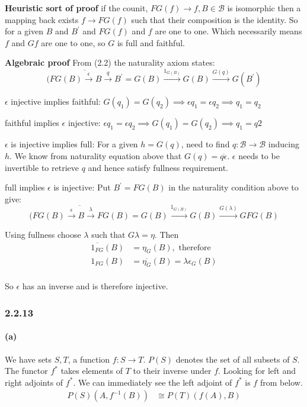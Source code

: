 \documentclass{article}
\begin{document}
\textbf{Heuristic sort of proof}
if the counit, $FG (f) \rightarrow f, B \in \mathcal{B}$ is isomorphic then a mapping back exists $f \rightarrow FG (f)$ such that their composition is the identity. So for a given $B$ and $B^\prime$ and $FG(f)$ and $f$ are one to one. Which necessarily means $f$ and $Gf$ are one to one, so $G$ is full and faithful.

\textbf{Algebraic proof}
From (2.2) the naturality axiom states:
\begin{equation*}
\overline{(FG(B) \xrightarrow{\epsilon} B \xrightarrow{q} {B^\prime}} =
G(B) \xrightarrow{1_{G(B)}} G(B) \xrightarrow{G(q)} G(B^\prime)
\end{equation*}

$\epsilon$ injective implies faithful:
$G(q_1) = G(q_2) \implies \epsilon q_1 = \epsilon q_2 \implies q_1 = q_2$

faithful implies $\epsilon$ injective:
$\epsilon q_1 = \epsilon q_2 \implies G(q_1) = G(q_2) \implies q_1 = q2$

$\epsilon$ is injective implies full:
For a given $h = G(q)$, need to find $q: \mathcal{B} \rightarrow \mathcal{B}$ inducing $h$. We know from naturality equation above that $G(q) = \overline{q\epsilon}$. $\epsilon$ needs to be invertible to retrieve $q$ and hence satisfy fullness requirement.

full implies $\epsilon$ is injective: Put $B^\prime = FG(B)$ in the naturality condition above to give:
\begin{equation*}
\overline{(FG(B) \xrightarrow{\epsilon} B \xrightarrow{\lambda} {FG(B)}} =
G(B) \xrightarrow{1_{G(B)}} G(B) \xrightarrow{G(\lambda)} GFG(B)
\end{equation*}

Using fullness choose $\lambda$ such that $G\lambda = \eta$. Then
\begin{align*}
  \overline{1_{FG}}(B) &= \eta_G(B), \text{ therefore } \\
  1_{FG}(B) &= \overline{\eta_G}(B) = \lambda\epsilon_G(B) \\
\end{align*}

So $\epsilon$ has an inverse and is therefore injective.

\subsubsection*{2.2.13}
\paragraph{(a)}
We have sets $S, T$, a function $f\colon S \rightarrow T$. $P(S)$ denotes the set of all subsets of $S$. The functor $f^*$ takes elements of $T$ to their inverse under $f$. Looking for left and right adjoints of $f^*$. We can immediately see the left adjoint of $f^*$ is $f$ from below.
\begin{align}
\label{eqn:2213a1}
  P(S)(A,f^{-1}(B)) & \cong P(T)(f(A), B)
\end{align}
\end{document}
